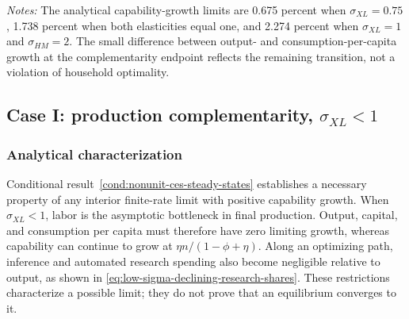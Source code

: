 \begin{table}[htbp]
    \centering
    \caption{Endpoints of the equilibrium transitions}
    \label{tab:equilibrium-transition-endpoints}
    \begin{minipage}{0.96\textwidth}
    \footnotesize\emph{Notes:} The analytical capability-growth limits are
    0.675 percent when $\sigma_{XL}=0.75$, 1.738 percent when both elasticities
    equal one, and 2.274 percent when $\sigma_{XL}=1$ and $\sigma_{HM}=2$.
    The small difference between output- and
    consumption-per-capita growth at the complementarity endpoint reflects the
    remaining transition, not a violation of household optimality.
    \end{minipage}
\end{table}

\subsection{Case I: production complementarity, $\sigma_{XL}<1$}
\label{sec:case-production-complements}

\subsubsection{Analytical characterization}

Conditional result~\ref{cond:nonunit-ces-steady-states} establishes a necessary
property of any interior finite-rate limit with positive capability growth. When
$\sigma_{XL}<1$, labor is the asymptotic bottleneck in final production. Output,
capital, and consumption per capita must therefore have zero limiting growth,
whereas capability can continue to grow at
$\eta n/(1-\phi+\eta)$. Along an optimizing path, inference and automated
research spending also become negligible relative to output, as shown in
\eqref{eq:low-sigma-declining-research-shares}. These restrictions characterize a
possible limit; they do not prove that an equilibrium converges to it.


